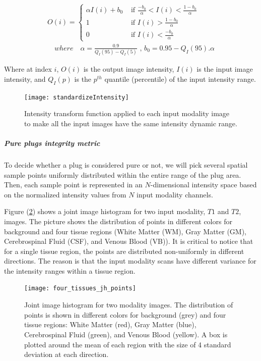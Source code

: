 \begin{equation}
\label{eq:standardizeIntensity}
\begin{gathered}
O(i) = \begin{cases}
\alpha I(i) + b_{0} & \text{ if   } \frac{-b_0}{\alpha} < I(i) < \frac{1-b_0}{\alpha} \\ 
1 & \text{ if } I(i) > \frac{1-b_0}{\alpha} \\ 
0  & \text{ if } I(i) < \frac{-b_0}{\alpha} 
\end{cases} \\
\quad where \quad \alpha = \frac{0.9}{ Q_I(95) - Q_I(5) } 
\text{  ,  } b_0 = 0.95 - Q_I(95) . \alpha
\end{gathered}
\end{equation}

Where at index $i$, $O(i)$ is the output image intensity, $I(i)$ is the input image intensity, and $Q_I(p)$ is the $p^{th}$ quantile (percentile) of the input intensity range.

\begin{figure}
\centering
\texttt{[image: standardizeIntensity]}\
\centering
\caption{Intensity transform function applied to each input modality image to make all the input images have the same intensity dynamic range.} 
\label{fig:standardizeIntensity}
\end{figure}

\subparagraph{Pure plugs integrity metric}

To decide whether a plug is considered pure or not, we will pick several spatial sample points uniformly distributed within the entire range of the plug area. Then, each sample point is represented in an $N$-dimensional intensity space based on the normalized intensity values from $N$ input modality channels.

Figure (\ref{fig:four_tissues_jh_points}) shows a joint image histogram for two input modality, $T1$ and $T2$, images.
The picture shows the distribution of points in different colors for background and four tissue regions (White Matter (WM), Gray Matter (GM), Cerebrospinal Fluid (CSF), and Venous Blood (VB)).
It is critical to notice that for a single tissue region, the points are distributed non-uniformly in different directions. The reason is that the input modality scans have different variance for the intensity ranges within a tissue region.

\begin{figure}
\centering
\texttt{[image: four\_tissues\_jh\_points]}\
\centering
\caption{Joint image histogram for two modality images. The distribution of points is shown in different colors for background (grey) and four tissue regions: White Matter (red), Gray Matter (blue), Cerebrospinal Fluid (green), and Venous Blood (yellow). A box is plotted around the mean of each region with the size of 4 standard deviation at each direction.} 
\label{fig:four_tissues_jh_points}
\end{figure}

